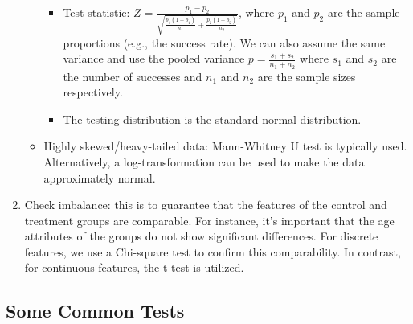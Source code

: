\begin{enumerate}
\begin{itemize}
                            \begin{itemize}
                                \item Test statistic: $Z = \frac{p_1 - p_2}{\sqrt{\frac{p_1(1-p_1)}{n_1} + \frac{p_2(1-p_2)}{n_2}} }$, where $p_1$ and $p_2$ are the sample proportions (e.g., the success rate).
                                We can also assume the same variance and use the pooled variance $p = \frac{s_1 + s_2}{n_1+n_2}$ where $s_1$ and $s_2$ are the number of successes and $n_1$ and $n_2$ are the sample sizes respectively. 
                                \item The testing distribution is the standard normal distribution. 
                            \end{itemize}
                        \item Highly skewed/heavy-tailed data: Mann-Whitney U test is typically used. Alternatively, a log-transformation can be used to make the data approximately normal. 
                    \end{itemize}
                \item Check imbalance: this is to guarantee that the features of the control and treatment groups are comparable. For instance, it's important that the age attributes of the groups do not show significant differences. For discrete features, we use a Chi-square test to confirm this comparability. In contrast, for continuous features, the t-test is utilized.
            \end{enumerate}
    
    
    \subsection{Some Common Tests}
        
